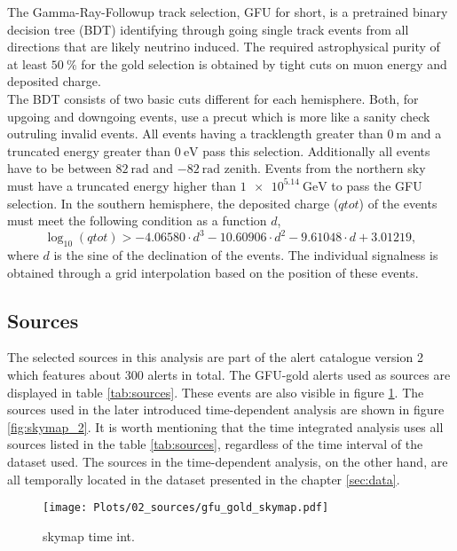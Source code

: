 The Gamma-Ray-Followup track selection, GFU for short, is a pretrained binary decision tree (BDT) identifying through going single track events from all directions that are likely neutrino induced.
The required astrophysical purity of at least $\SI{50}{\percent}$ for the gold selection is obtained by tight cuts on muon energy and deposited charge.\\
The BDT consists of two basic cuts different for each hemisphere.
Both, for upgoing and downgoing events, use a precut which is more like a sanity check outruling invalid events.
All events having a tracklength greater than $\SI{0}{\meter}$ and a truncated energy greater than $\SI{0}{\electronvolt}$ pass this selection.
Additionally all events have to be between $\SI{82}{\radian}$ and $\SI{-82}{\radian}$ zenith.
Events from the northern sky must have a truncated energy higher than $\SI{1e5.14}{\giga\electronvolt}$ to pass the GFU selection.
In the southern hemisphere, the deposited charge ($qtot$) of the events must meet the following condition as a function $d$,
\begin{equation}
  \log_{10}(qtot) > -4.06580\cdot d^3 - 10.60906\cdot d^2  -9.61048\cdot d + 3.01219,
\end{equation}
where $d$ is the sine of the declination of the events.
The individual signalness is obtained through a grid interpolation based on the position of these events.

\subsection{Sources}

The selected sources in this analysis are part of the alert catalogue version 2 which features about 300 alerts in total.
The GFU-gold alerts used as sources are displayed in table \ref{tab:sources}.
These events are also visible in figure \ref{fig:skymap_1}.
The sources used in the later introduced time-dependent analysis are shown in figure \ref{fig:skymap_2}.
It is worth mentioning that the time integrated analysis uses all sources listed in the table \ref{tab:sources}, regardless of the time interval of the dataset used.
The sources in the time-dependent analysis, on the other hand, are all temporally located in the dataset presented in the chapter \ref{sec:data}.

\begin{figure}
    \centering
    \texttt{[image: Plots/02\_sources/gfu\_gold\_skymap.pdf]}
    \label{fig:skymap_1}
    \caption{skymap time int.}
\end{figure}

